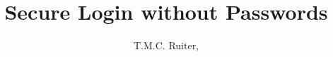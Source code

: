 \documentclass[a4paper,draft]{article}
\title{Secure Login without Passwords}
\author{T.M.C. Ruiter, \XORlogo}
\begin{document}
\maketitle
\newcommand{\includesection}[1]{\newpage}
\newcommand{\includesectionnopagebreak}[1]{}
\includesection{abstract}
\newpage


\newpage
\includesection{keys}
\includesection{login}
\includesectionnopagebreak{conclusion}


\end{document}
